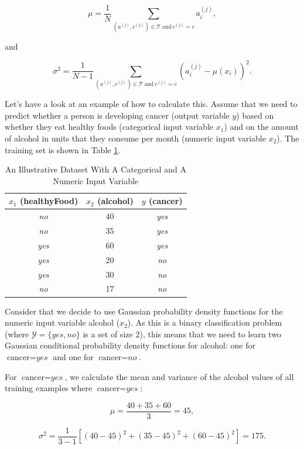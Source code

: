 \[ \mu = \frac{1}{N} \sum_{(a^{(j)},c^{(j)}) \in \mathcal{T} \ \text{and} \ c^{(j)} = c} a_i^{(j)}, \]

and

\[ \sigma^2 = \frac{1}{N - 1} \sum_{(a^{(j)},c^{(j)}) \in \mathcal{T} \ \text{and} \ c^{(j)} = c} (a_i^{(j)} - \mu(x_i))^2 .\]

Let's have a look at an example of how to calculate this. Assume that we need to predict whether a person is developing cancer (output variable $y$) based on whether they eat healthy foods (categorical input variable $x_1$) and on the amount of alcohol in units that they consume per month (numeric input variable $x_2$). The training set is shown in Table \ref{tab:dataset-2dim-numeric}.

\begin{table}[ht]
\centering
\caption{An Illustrative Dataset With A Categorical and A Numeric Input Variable} \label{tab:dataset-2dim-numeric}
\begin{tabular}{|c|c||c|} \hline
$x_1$ (healthyFood) & $x_2$ (alcohol) & $y$ (cancer) \\ \hline
\textit{no} & 40 & \textit{yes} \\
\textit{no} & 35 &  \textit{yes} \\
\textit{yes} & 60 &  \textit{yes} \\
\textit{yes} & 20 &  \textit{no} \\
\textit{yes} & 30 &  \textit{no} \\
\textit{no} & 17 &  \textit{no} \\ \hline
\end{tabular}
\end{table}

Consider that we decide to use Gaussian probability density functions for the numeric input variable alcohol ($x_2$). As this is a binary classification problem (where $\mathcal{Y} = \{\textit{yes},\textit{no}\}$ is a set of size 2), this means that we need to learn two Gaussian conditional probability density functions for alcohol: one for $\text{cancer}=\textit{yes}$ and one for $\text{cancer}=\textit{no}$.

For $\text{cancer} = \textit{yes}$, we calculate the mean and variance of the alcohol values of all training examples where $\text{cancer} = \textit{yes}$:

\[ \mu = \frac{40 + 35 + 60}{3} = 45,\]

\[ \sigma^2 = \frac{1}{3-1} [(40 - 45)^2+(35 - 45)^2+(60 - 45)^2] = 175.\]

